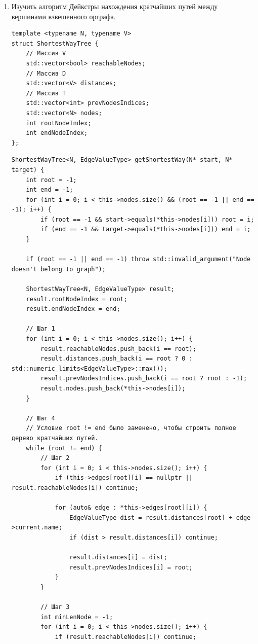 \documentclass[a4paper,14pt]{extarticle}
\begin{document}
\begin{enumerate}[1.]
    \item Изучить алгоритм Дейкстры нахождения кратчайших путей между вершинами взвешенного орграфа.\\
        \begin{verbatim}
template <typename N, typename V>
struct ShortestWayTree {
    // Массив V
    std::vector<bool> reachableNodes;
    // Массив D
    std::vector<V> distances;
    // Массив T
    std::vector<int> prevNodesIndices;
    std::vector<N> nodes;
    int rootNodeIndex;
    int endNodeIndex;
};
        \end{verbatim}
        \begin{verbatim}
ShortestWayTree<N, EdgeValueType> getShortestWay(N* start, N* target) {
    int root = -1;
    int end = -1;
    for (int i = 0; i < this->nodes.size() && (root == -1 || end == -1); i++) {
        if (root == -1 && start->equals(*this->nodes[i])) root = i;
        if (end == -1 && target->equals(*this->nodes[i])) end = i;
    }

    if (root == -1 || end == -1) throw std::invalid_argument("Node doesn't belong to graph");

    ShortestWayTree<N, EdgeValueType> result;
    result.rootNodeIndex = root;
    result.endNodeIndex = end;

    // Шаг 1
    for (int i = 0; i < this->nodes.size(); i++) {
        result.reachableNodes.push_back(i == root);
        result.distances.push_back(i == root ? 0 : std::numeric_limits<EdgeValueType>::max());
        result.prevNodesIndices.push_back(i == root ? root : -1);
        result.nodes.push_back(*this->nodes[i]);
    }

    // Шаг 4
    // Условие root != end было заменено, чтобы строить полное дерево кратчайших путей.
    while (root != end) {
        // Шаг 2
        for (int i = 0; i < this->nodes.size(); i++) {
            if (this->edges[root][i] == nullptr || result.reachableNodes[i]) continue;

            for (auto& edge : *this->edges[root][i]) {
                EdgeValueType dist = result.distances[root] + edge->current.name;
                if (dist > result.distances[i]) continue;
            
                result.distances[i] = dist;
                result.prevNodesIndices[i] = root;
            }
        }

        // Шаг 3
        int minLenNode = -1;
        for (int i = 0; i < this->nodes.size(); i++) {
            if (result.reachableNodes[i]) continue;


\end{verbatim}
\end{enumerate}
\end{document}
